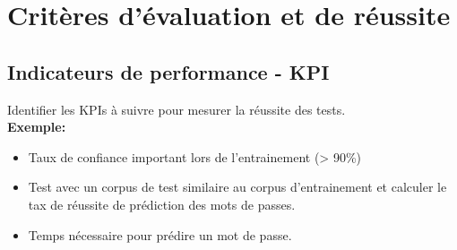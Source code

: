\section{Critères d'évaluation et de réussite}
\subsection{Indicateurs de performance - KPI}
Identifier les KPIs à suivre pour mesurer la réussite des tests.\\
\textbf{Exemple:}
\begin{itemize}
    \item Taux de confiance important lors de l'entrainement (> 90\%)
    \item Test avec un corpus de test similaire au corpus d'entrainement et calculer le tax de réussite de prédiction des mots de passes.
    \item Temps nécessaire pour prédire un mot de passe.
\end{itemize}